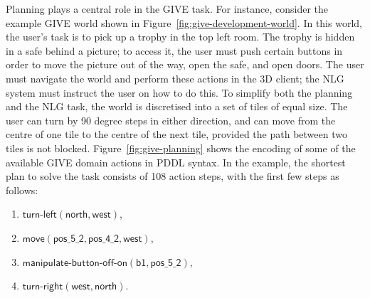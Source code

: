 Planning plays a central role in the GIVE task. For instance, consider the
example GIVE world shown in Figure~\ref{fig:give-development-world}. In
this world, the user's task is to pick up a trophy in the top left room.
The trophy is hidden in a safe behind a picture; to access it, the user
must push certain buttons in order to move the picture out of the way, open
the safe, and open doors. The user must navigate the world and perform
these actions in the 3D client; the NLG system must instruct the user on
how to do this. To simplify both the planning and the NLG task, the world
is discretised into a set of tiles of equal size. The user can turn by 90
degree steps in either direction, and can move from the centre of one tile
to the centre of the next tile, provided the path between two tiles is not
blocked. Figure~\ref{fig:give-planning} shows the encoding of some of the
available GIVE domain actions in PDDL syntax. In the example, the shortest
plan to solve the task consists of 108 action steps, with the first few
steps as follows:
%
\begin{enumerate}
\item $\mathsf{turn}\textsf{-}\mathsf{left}(\mathsf{north},
\mathsf{west})$,
\item $\mathsf{move}(\mathsf{pos\_5\_2}, \mathsf{pos\_4\_2}, \mathsf{west})$,
\item $\mathsf{manipulate}\textsf{-}\mathsf{button}\textsf{-}\mathsf{off}\textsf{-}\mathsf{on}(\mathsf{b1, pos\_5\_2})$,
\item $\mathsf{turn}\textsf{-}\mathsf{right}(\mathsf{west}, \mathsf{north})$.
\end{enumerate}

